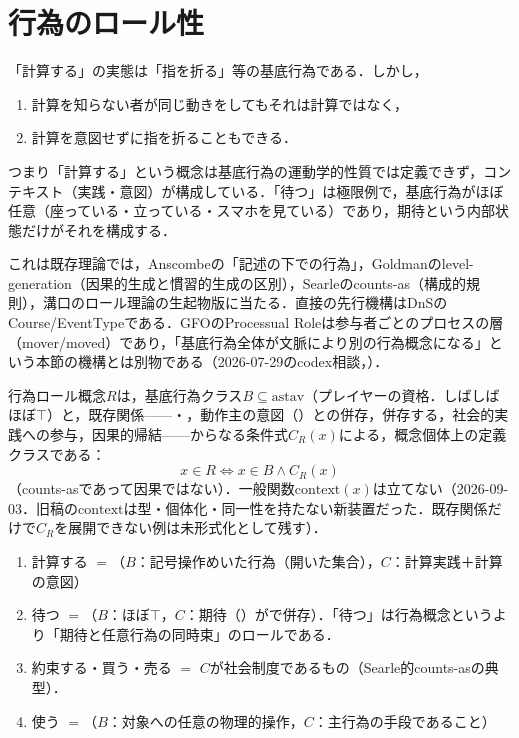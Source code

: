 \documentclass[../../main-detail.tex]{subfiles}
\begin{document}
\section{行為のロール性}
「計算する」の実態は「指を折る」等の基底行為である．しかし，
\begin{enumerate}
    \item 計算を知らない者が同じ動きをしてもそれは計算ではなく，
    \item 計算を意図せずに指を折ることもできる．
\end{enumerate}
つまり「計算する」という概念は基底行為の運動学的性質では定義できず，コンテキスト（実践・意図）が構成している．「待つ」は極限例で，基底行為がほぼ任意（座っている・立っている・スマホを見ている）であり，期待という内部状態だけがそれを構成する．

これは既存理論では，Anscombe\citep{anscombe1957}の「記述の下での行為」，Goldman\citep{goldman1970}のlevel-generation（因果的生成と慣習的生成の区別），Searle\citep{searle1995}のcounts-as（構成的規則），溝口のロール理論\citep{mizoguchi2015roles}の生起物版に当たる．直接の先行機構はDnSのCourse/EventType\citep{gangemi-mika2003}である．GFO\citep{herre2006gfo}のProcessual Roleは参与者ごとのプロセスの層（mover/moved）であり，「基底行為全体が文脈により別の行為概念になる」という本節の機構とは別物である（2026-07-29のcodex相談，）．

\begin{definition}[行為ロール]
行為ロール概念$R$は，基底行為クラス$B \subseteq \text{astav}$（プレイヤーの資格．しばしばほぼ$\top$）と，既存関係——・，動作主の意図（）との併存，併存する，社会的実践への参与，因果的帰結——からなる条件式$C_R(x)$による，概念個体上の定義クラスである：
\[
    x \in R \iff x \in B \land C_R(x)
\]
（counts-asであって因果ではない）．一般関数$\mathrm{context}(x)$は立てない（2026-09-03．旧稿の$\mathrm{context}$は型・個体化・同一性を持たない新装置だった．既存関係だけで$C_R$を展開できない例は未形式化として残す）．
\end{definition}
\begin{example}
\begin{enumerate}
    \item 計算する $=$（$B$：記号操作めいた行為（開いた集合），$C$：計算実践＋計算の意図）
    \item 待つ $=$（$B$：ほぼ$\top$，$C$：期待（）がで併存）．「待つ」は行為概念というより「期待と任意行為の同時束」のロールである．
    \item 約束する・買う・売る $=$ $C$が社会制度であるもの（Searle的counts-asの典型）．
    \item 使う $=$（$B$：対象への任意の物理的操作，$C$：主行為の手段であること）
\end{enumerate}
\end{example}
\end{document}
